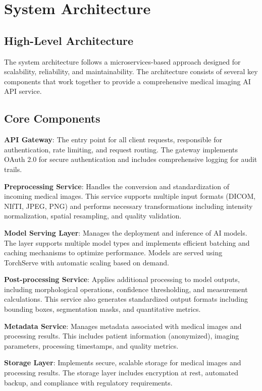 \documentclass[12pt,a4paper]{article}
\begin{document}
\section{System Architecture}

\subsection{High-Level Architecture}

The system architecture follows a microservices-based approach designed for scalability, reliability, and maintainability. The architecture consists of several key components that work together to provide a comprehensive medical imaging AI API service.

\subsection{Core Components}

\textbf{API Gateway}: The entry point for all client requests, responsible for authentication, rate limiting, and request routing. The gateway implements OAuth 2.0 for secure authentication and includes comprehensive logging for audit trails.

\textbf{Preprocessing Service}: Handles the conversion and standardization of incoming medical images. This service supports multiple input formats (DICOM, NIfTI, JPEG, PNG) and performs necessary transformations including intensity normalization, spatial resampling, and quality validation.

\textbf{Model Serving Layer}: Manages the deployment and inference of AI models. The layer supports multiple model types and implements efficient batching and caching mechanisms to optimize performance. Models are served using TorchServe with automatic scaling based on demand.

\textbf{Post-processing Service}: Applies additional processing to model outputs, including morphological operations, confidence thresholding, and measurement calculations. This service also generates standardized output formats including bounding boxes, segmentation masks, and quantitative metrics.

\textbf{Metadata Service}: Manages metadata associated with medical images and processing results. This includes patient information (anonymized), imaging parameters, processing timestamps, and quality metrics.

\textbf{Storage Layer}: Implements secure, scalable storage for medical images and processing results. The storage layer includes encryption at rest, automated backup, and compliance with regulatory requirements.
\end{document}
